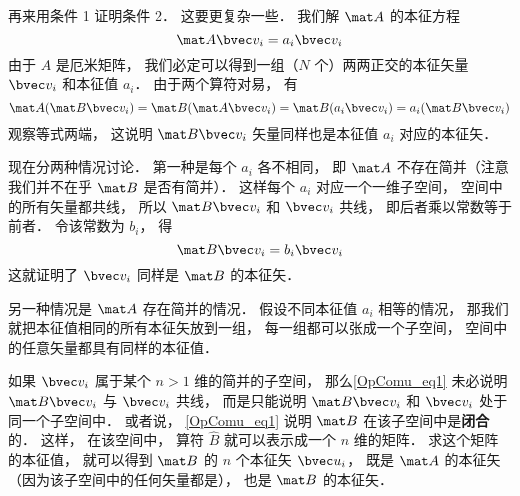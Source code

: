 再来用条件 1 证明条件 2． 这要更复杂一些． 我们解 $\mat A$ 的本征方程
\begin{equation}
\mat A \bvec v_i = a_i \bvec v_i
\end{equation}
由于 $A$ 是厄米矩阵， 我们必定可以得到一组（$N$ 个）两两正交的本征矢量 $\bvec v_i$ 和本征值 $a_i$． 由于两个算符对易， 有
\begin{equation}
\mat A (\mat B \bvec v_i) = \mat B (\mat A \bvec v_i) = \mat B (a_i \bvec v_i) = a_i (\mat B \bvec v_i)
\end{equation}
观察等式两端， 这说明 $\mat B \bvec v_i$ 矢量同样也是本征值 $a_i$ 对应的本征矢．

现在分两种情况讨论． 第一种是每个 $a_i$ 各不相同， 即 $\mat A$ 不存在简并（注意我们并不在乎 $\mat B$ 是否有简并）． 这样每个 $a_i$ 对应一个一维子空间， 空间中的所有矢量都共线， 所以 $\mat B \bvec v_i$ 和 $\bvec v_i$ 共线， 即后者乘以常数等于前者． 令该常数为 $b_i$， 得
\begin{equation}
\mat B \bvec v_i = b_i \bvec v_i
\end{equation}
这就证明了 $\bvec v_i$ 同样是 $\mat B$ 的本征矢．

另一种情况是 $\mat A$ 存在简并的情况． 假设不同本征值 $a_i$ 相等的情况， 那我们就把本征值相同的所有本征矢放到一组， 每一组都可以张成一个子空间， 空间中的任意矢量都具有同样的本征值．

如果 $\bvec v_i$ 属于某个 $n > 1$ 维的简并的子空间， 那么\autoref{OpComu_eq1} 未必说明 $\mat B \bvec v_i$ 与 $\bvec v_i$ 共线， 而是只能说明 $\mat B \bvec v_i$ 和 $\bvec v_i$ 处于同一个子空间中． 或者说， \autoref{OpComu_eq1} 说明 $\mat B$ 在该子空间中是\textbf{闭合}的． 这样， 在该空间中， 算符 $\hat B$ 就可以表示成一个 $n$ 维的矩阵． 求这个矩阵的本征值， 就可以得到 $\mat B$ 的 $n$ 个本征矢 $\bvec u_i$， 既是 $\mat A$ 的本征矢（因为该子空间中的任何矢量都是）， 也是 $\mat B$ 的本征矢．

